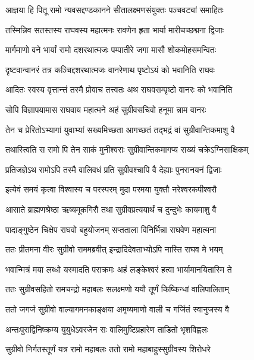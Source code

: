 \twolineshloka
{आज्ञया हि पितू रामो न्यवसद्दण्डकानने}
{सीतालक्ष्मणसंयुक्तः पञ्चवट्यां समाहितः}%

\twolineshloka
{तस्मिन्निव सतस्तस्य राघवस्य महात्मनः}
{रावणेन हृता भार्या मारीचच्छद्मना द्विजाः}%

\twolineshloka
{मार्गमाणो वने भार्यां रामो दशरथात्मजः}
{पम्पातीरे जगा मासौ शोकमोहसमन्वितः}%

\twolineshloka
{दृष्टवान्वानरं तत्र कञ्चिद्दशरथात्मजः}
{वानरेणाथ पृष्टोऽयं को भवानिति राघवः}%

\twolineshloka
{आदितः स्वस्य वृत्तान्त्तं तस्मै प्रोवाच तत्त्वतः}
{अथ राघवसम्पृष्टो वानरः को भवानिति}%

\twolineshloka
{सोपि विज्ञापयामास राघवाय महात्मने}
{अहं सुग्रीवसचिवो हनूमा न्नाम वानरः}%

\twolineshloka
{तेन च प्रेरितोऽभ्यागां युवाभ्यां सख्यमिच्छता}
{आगच्छतं तद्भद्रं वां सुग्रीवान्तिकमाशु वै}%

\twolineshloka
{तथास्त्विति स रामो पि तेन साकं मुनीश्वराः}
{सुग्रीवान्तिकमागप्य सख्यं चक्रेऽग्निसाक्षिकम्}%

\twolineshloka
{प्रतिजज्ञेऽथ रामोऽपि तस्मै वालिवधं प्रति}
{सुग्रीवश्चापि वै देह्याः पुनरानयनं द्विजाः}%

\twolineshloka
{इत्येवं समयं कृत्वा विश्वास्य च परस्परम्}
{मुदा परमया युक्तौ नरेश्वरकपीश्वरौ}%

\twolineshloka
{आसाते ब्राह्मणश्रेष्ठा ऋष्यमूकगिरौ तथा}
{सुग्रीवप्रत्ययार्थं च दुन्दुभेः कायमाशु वै}%

\twolineshloka
{पादाङ्गुष्ठेन चिक्षेप राघवो बहुयोजनम्}
{सप्तताला विनिर्भिन्ना राघवेण महात्मना}%

\twolineshloka
{ततः प्रीतमना वीरः सुग्रीवो राममब्रवीत्}
{इन्द्रादिदेवताभ्योऽपि नास्ति राघव मे भयम्}%

\twolineshloka
{भवान्मित्रं मया लब्धो यस्मादति पराक्रमः}
{अहं लङ्केश्वरं हत्वा भार्यामानयितास्मि ते}%

\twolineshloka
{ततः सुग्रीवसहितो रामचन्द्रो महाबलः}
{सलक्ष्मणो ययौ तूर्णं किष्किन्धां वालिपालिताम्}%

\twolineshloka
{ततो जगर्ज सुग्रीवो वाल्यागमनकाङ्क्षया}
{अमृष्यमाणो वाली च गर्जितं स्वानुजस्य वै}%

\twolineshloka
{अन्तःपुराद्विनिष्क्रम्य युयुधेऽवरजेन सः}
{वालिमुष्टिप्रहारेण ताडितो भृशविह्वलः}%

\twolineshloka
{सुग्रीवो निर्गतस्तूर्णं यत्र रामो महाबलः}
{ततो रामो महाबाहुस्सुग्रीवस्य शिरोधरे}%

